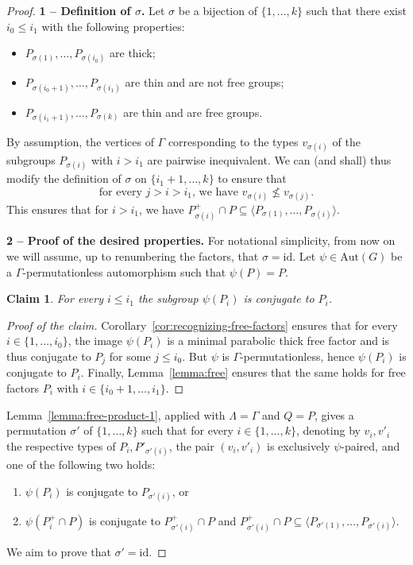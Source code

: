 \documentclass[a4paper,english,11pt]{article}
\newtheorem{claim}[de]{Claim}
\theoremstyle{definition}
\theoremstyle{remark}
\newcommand{\Aut}{\mathrm{Aut}}
\begin{document}
\begin{proof}
\textbf{1 -- Definition of $\sigma$.} Let $\sigma$ be a bijection of $\{1,\dots,k\}$ such that there exist $i_0\le i_1$ with the following properties:
\begin{itemize}
\item $P_{\sigma(1)},\dots,P_{\sigma(i_0)}$ are thick; 
\item $P_{\sigma(i_0+1)},\dots,P_{\sigma(i_1)}$ are thin and are not free groups; 
\item $P_{\sigma(i_1+1)},\dots,P_{\sigma(k)}$ are thin and are free groups.
\end{itemize}
By assumption, the vertices of $\Gamma$ corresponding to the types $v_{\sigma(i)}$ of the subgroups $P_{\sigma(i)}$ with $i>i_1$ are pairwise inequivalent. We can (and shall) thus modify the definition of $\sigma$ on $\{i_1+1,\dots,k\}$ to ensure that 
\begin{equation}\label{ordering2}\tag{$\star\star\star$}
\text{for every $j>i>i_1$, we have $v_{\sigma(i)}\not\leq v_{\sigma(j)}$.}
\end{equation}
 This ensures that for $i>i_1$, we have $P_{\sigma(i)}^+\cap P\subseteq\langle P_{\sigma(1)},\dots,P_{\sigma(i)}\rangle$.

\medskip

\textbf{2 -- Proof of the desired properties.} For notational simplicity, from now on we will assume, up to renumbering the factors, that $\sigma=\mathrm{id}$. Let $\psi\in\Aut(G)$ be a $\Gamma$-permutationless automorphism such that $\psi(P)=P$.

\begin{claim}\label{claim:free1} 
For every $i\le i_1$ the subgroup $\psi(P_i)$ is conjugate to $P_i$.
\end{claim}

\begin{proof}[Proof of the claim]
Corollary~\ref{cor:recognizing-free-factors} ensures that for every $i\in\{1,\dots,i_0\}$, the image $\psi(P_i)$ is a minimal parabolic thick free factor and is thus conjugate to $P_{j}$ for some $j\leq i_0$. But $\psi$ is $\Gamma$-permutationless, hence $\psi(P_i)$ is conjugate to $P_i$. Finally, Lemma~\ref{lemma:free} ensures that the same holds for free factors $P_i$ with $i\in\{i_0+1,\dots,i_1\}$.
\end{proof}

Lemma~\ref{lemma:free-product-1}, applied with $\Lambda=\Gamma$ and $Q=P$, gives a permutation $\sigma'$ of $\{1,\dots,k\}$ such that for every $i\in\{1,\dots,k\}$, denoting by $v_i,v'_i$ the respective types of $P_i,P'_{\sigma'(i)}$, the pair $(v_i,v'_i)$ is exclusively $\psi$-paired, and one of the following two holds: 
\begin{enumerate}
\item $\psi(P_i)$ is conjugate to $P_{\sigma'(i)}$, or 
\item $\psi(P_i^+\cap P)$ is conjugate to $P_{\sigma'(i)}^+\cap P$ and $ P_{\sigma'(i)}^+\cap P\subseteq \langle  P_{\sigma'(1)},\dots, P_{\sigma'(i)}\rangle$. 
\end{enumerate}
We aim to prove that $\sigma'=\mathrm{id}$.


\end{proof}
\end{document}
